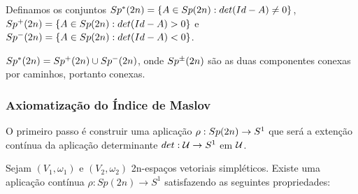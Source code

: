 \documentclass{beamer}
\begin{document}
	\begin{frame}
		Definamos os conjuntos $Sp^{*}(2n) = \{ A \in Sp(2n): det(Id-A)\neq 0 \}$, $Sp^{+}(2n) = \{ A \in Sp(2n): det(Id-A)> 0 \}$ e  $Sp^{-}(2n) = \{ A \in Sp(2n): det(Id-A)< 0 \}$.
		
		\begin{lema}
			$Sp^{*}(2n) = Sp^{+}(2n)\cup Sp^{-}(2n)$, onde $Sp^{\pm}(2n)$ são as duas componentes conexas por caminhos, portanto conexas.
		\end{lema}
		
	\end{frame}
	
	\begin{frame}
		\frametitle{Axiomatização do Índice de Maslov}
		
		O primeiro passo é construir uma aplicação $\rho: Sp(2n)\to S^{1}$ que será a extenção contínua da aplicação determinante $det:\mathcal{U}\to S^{1}$ em $\mathcal{U}$.
		
		\begin{teorema}
			Sejam $(V_{1}, \omega_{1})$ e $(V_{2}, \omega_{2})$ 2n-espaços vetoriais simpléticos. Existe uma aplicação contínua $\rho:Sp(2n) \to S^{1}$ satisfazendo as seguintes propriedades:
			
		\end{teorema}
		
	\end{frame}
	
\end{document}
